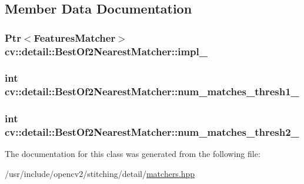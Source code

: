 \subsection{Member Data Documentation}
\hypertarget{classcv_1_1detail_1_1BestOf2NearestMatcher_a9e6b74e94d69e18705e961fe753c45c4}{
\subsubsection[{impl\-\_\-}]{\setlength{\rightskip}{0pt plus 5cm}Ptr$<${\bf Features\-Matcher}$>$ cv\-::detail\-::\-Best\-Of2\-Nearest\-Matcher\-::impl\-\_\-\hspace{0.3cm}{\ttfamily [protected]}}}\label{classcv_1_1detail_1_1BestOf2NearestMatcher_a9e6b74e94d69e18705e961fe753c45c4}
\hypertarget{classcv_1_1detail_1_1BestOf2NearestMatcher_a9feea2b5ac622dcacf9eba2f5a27dafd}{
\subsubsection[{num\-\_\-matches\-\_\-thresh1\-\_\-}]{\setlength{\rightskip}{0pt plus 5cm}int cv\-::detail\-::\-Best\-Of2\-Nearest\-Matcher\-::num\-\_\-matches\-\_\-thresh1\-\_\-\hspace{0.3cm}{\ttfamily [protected]}}}\label{classcv_1_1detail_1_1BestOf2NearestMatcher_a9feea2b5ac622dcacf9eba2f5a27dafd}
\hypertarget{classcv_1_1detail_1_1BestOf2NearestMatcher_ad1395b7d534b402b215519b6e9ac8bd9}{
\subsubsection[{num\-\_\-matches\-\_\-thresh2\-\_\-}]{\setlength{\rightskip}{0pt plus 5cm}int cv\-::detail\-::\-Best\-Of2\-Nearest\-Matcher\-::num\-\_\-matches\-\_\-thresh2\-\_\-\hspace{0.3cm}{\ttfamily [protected]}}}\label{classcv_1_1detail_1_1BestOf2NearestMatcher_ad1395b7d534b402b215519b6e9ac8bd9}


The documentation for this class was generated from the following file\-:\begin{DoxyCompactItemize}
\item 
/usr/include/opencv2/stitching/detail/\hyperlink{matchers_8hpp}{matchers.\-hpp}\end{DoxyCompactItemize}
